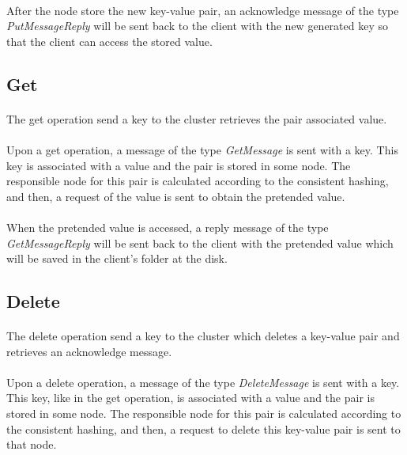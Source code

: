 \documentclass{report}
\begin{document}
					\paragraph{} After the node store the new key-value pair, an acknowledge
					message of the type \emph{PutMessageReply} will be sent back to the client
					with the new generated key so that the client can access the stored value.

				\subsection{Get}
					\paragraph{} The get operation send a key to the cluster retrieves
					the pair associated value.

					\paragraph{} Upon a get operation, a message of the type \emph{GetMessage}
					is sent with a key. This key is associated with a value and the pair is
					stored in some node. The responsible node for this pair is calculated
					according to the consistent hashing, and then, a request of the value
					is sent to obtain the pretended value.

					\paragraph{} When the pretended value is accessed, a reply message of the type
					\emph{GetMessageReply} will be sent back to the client with the pretended 
					value which will be saved in the client's folder at the disk.

				\subsection{Delete}
					\paragraph{} The delete operation send a key to the cluster which deletes
					a key-value pair and retrieves an acknowledge message.

					\paragraph{} Upon a delete operation, a message of the type \emph{DeleteMessage}
					is sent with a key. This key, like in the get operation, is associated 
					with a value and the pair is stored in some node. 
					The responsible node for this pair is calculated
					according to the consistent hashing, and then, a request to delete this
					key-value pair is sent to that node.
\end{document}
